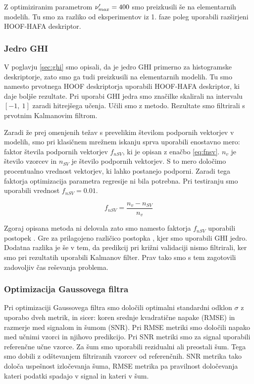 Z optimiziranim parametrom $\nu_{max}'=400$ smo \nurbf preizkusili še na elementarnih modelih. Tu smo za razliko od eksperimentov iz 1. faze poleg \nurbf uporabili razširjeni HOOF-HAFA deskriptor.







\subsubsection{Jedro GHI}
V poglavju \ref{sec:ghi} smo opisali, da je jedro GHI primerno za histogramske deskriptorje, zato smo ga tudi preizkusili na elementarnih modelih. Tu smo namesto prvotnega HOOF deskriptorja uporabili HOOF-HAFA deskriptor, ki daje boljše rezultate. Pri uporabi GHI jedra smo značilke skalirali na intervalu $[-1,~1]$ zaradi hitrejšega učenja. Učili smo z \esvr metodo. Rezultate smo filtrirali s prvotnim Kalmanovim filtrom.

Zaradi že prej omenjenih težav s prevelikim številom podpornih vektorjev v modelih, smo pri klasičnem mrežnem iskanju sprva uporabili enostavno mero: faktor števila podpornih vektorjev $f_{nSV}$, ki je opisan z enačbo \eqref{eq:fnsv}. $n_v$ je število vzorcev in $n_{SV}$ je število podpornih vektorjev. S to mero določimo procentualno vrednost vektorjev, ki lahko postanejo podporni. Zaradi tega faktorja optimizacija parametra regresije ni bila potrebna. Pri testiranju smo uporabili vrednost $f_{nSV} = 0.01$.


\begin{equation}
f_{nSV} = \frac{n_v - n_{SV}}{n_v}
\label{eq:fnsv}
\end{equation} 

Zgoraj opisana metoda ni delovala zato smo namesto faktorja $f_{nSV}$ uporabili postopek \nughi. Gre za prilagojeno različico postopka \nurbf, kjer smo uporabili GHI jedro. Dodatna razlika je še v tem, da predikcij pri križni validaciji nismo filtrirali, ker smo pri rezultatih uporabili Kalmanov filter. Prav tako smo s tem zagotovili zadovoljiv čas reševanja problema.






\subsubsection{Optimizacija Gaussovega filtra}
Pri optimizaciji Gaussovega filtra smo določili optimalni standardni odklon $\sigma$ z uporabo dveh metrik, in sicer: koren srednje kvadratične napake (RMSE) in razmerje med signalom in šumom (SNR). Pri RMSE metriki smo določili napako med učnimi vzorci in njihovo predikcijo. Pri SNR metriki smo za signal uporabili referenčne učne vzorce. Za šum smo uporabili rezidualni ali preostali šum. Tega smo dobili z odštevanjem filtriranih vzorcev od referenčnih. SNR metrika tako določa uspešnost izločevanja šuma, RMSE metrika pa pravilnost določevanja kateri podatki spadajo v signal in kateri v šum.


